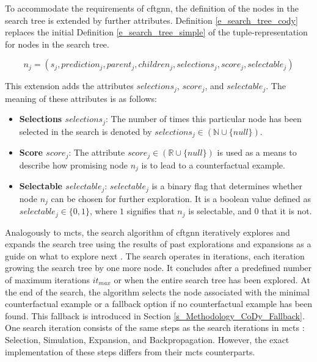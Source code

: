 To accommodate the requirements of \gls{cftgnn}, the definition of the nodes in the search tree is extended by further attributes. Definition \ref{e_search_tree_cody} replaces the initial Definition \ref{e_search_tree_simple} of the tuple-representation for nodes in the search tree.

\begin{equation}
    \label{e_search_tree_cody}
    n_j = (s_j, prediction_j, parent_j, children_j, selections_j, score_j, selectable_j)
\end{equation}

This extension adds the attributes $selections_j$, $score_j$, and $selectable_j$. The meaning of these attributes is as follows:

\begin{itemize}
    \item \textbf{Selections $selections_j$}: The number of times this particular node has been selected in the search is denoted by $selections_j \in (\mathbb{N} \cup \{null\})$.

    \item \textbf{Score $score_j$}: The attribute $score_j \in (\mathbb{R} \cup \{null\})$ is used as a means to describe how promising node $n_j$ is to lead to a counterfactual example.

    \item \textbf{Selectable $selectable_j$}: $selectable_j$ is a binary flag that determines whether node $n_j$ can be chosen for further exploration. It is a boolean value defined as $selectable_j \in \{0, 1\}$, where $1$ signifies that $n_j$ is selectable, and $0$ that it is not.
\end{itemize}


Analogously to \gls{mcts}, the search algorithm of \gls{cftgnn} iteratively explores and expands the search tree using the results of past explorations and expansions as a guide on what to explore next \cite{browne_survey_2012}. The search operates in iterations, each iteration growing the search tree by one more node. It concludes after a predefined number of maximum iterations $it_{max}$ or when the entire search tree has been explored. At the end of the search, the algorithm selects the node associated with the minimal counterfactual example or a fallback option if no counterfactual example has been found. This fallback is introduced in Section \ref{s_Methodology_CoDy_Fallback}. One search iteration consists of the same steps as the search iterations in \gls{mcts} \cite{browne_survey_2012}: Selection, Simulation, Expansion, and Backpropagation. However, the exact implementation of these steps differs from their \gls{mcts} counterparts.

